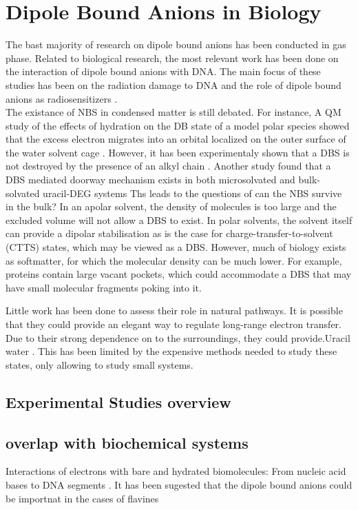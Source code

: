 \section{Dipole Bound Anions in Biology}
The bast majority of research on dipole bound anions has been conducted in gas phase. Related to biological research, the most relevant work has been done on the interaction of dipole bound anions with DNA. The main focus of these studies has been on the radiation damage to DNA \cite{narayanan2023secondary} and the role of dipole bound anions as radiosensitizers \cite{sedmidubska2024interaction}. \\
The existance of NBS in condensed matter is still debated. For instance, A QM study of the effects of hydration on the DB state of a model polar species showed that the excess electron migrates into an orbital localized on the outer surface of the water solvent cage \cite{anusiewicz2020fate}. However, it has been experimentaly shown that a DBS is not destroyed by the presence of an alkyl chain \cite{castellani2019stability}. Another study found that a DBS mediated doorway mechanism exists in both microsolvated and bulk-solvated uracil-DEG systems \cite{narayanan2024electron} Ths leads to the questions of can the NBS survive in the bulk? In an apolar solvent, the density of molecules is too large and the excluded volume will not allow a DBS to exist. In polar solvents, the solvent itself can provide a dipolar stabilisation as is the case for charge-transfer-to-solvent (CTTS) states,\cite{bradforth2002excited,chen2000precursors} which may be viewed as a DBS. However, much of biology exists as softmatter, for which the molecular density can be much lower. For example, proteins contain large vacant pockets, which
could accommodate a DBS that may have small molecular
fragments poking into it.

Little work has been done to assess their role in natural pathways. It is possible that they could provide an elegant way to regulate long-range electron transfer. Due to their strong dependence on to the surroundings, they could provide.Uracil water \cite{clarke2025role}.
This has been limited by the expensive methods needed to study these states, only allowing to study small systems.\\
\subsection{Experimental Studies overview}
\subsection{overlap with biochemical systems}
Interactions of electrons with bare and hydrated biomolecules: From nucleic acid bases to DNA segments \cite{gu2012interactions}. 
It has been sugested that the dipole bound anions could be importnat in the cases of flavines \cite{matthews2018observation}

